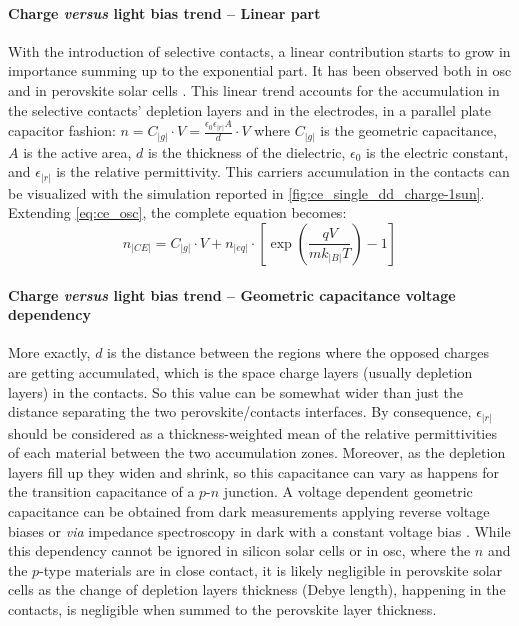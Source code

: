 		\paragraph{Charge \textsl{versus} light bias trend -- Linear part}
		With the introduction of selective contacts, a linear contribution starts to grow in importance summing up to the exponential part.
		It has been observed both in \gls{osc} \cite{Ryan2017a,Credgington2014} and in perovskite solar cells \cite{Gelmetti2017,Wheeler2017,Du2018}.
		This linear trend accounts for the accumulation in the selective contacts' depletion layers and in the electrodes, in a parallel plate capacitor fashion: $n = C_|g| \cdot V = \frac{\epsilon_0 \epsilon_|r| A}{d} \cdot V$ where $C_|g|$ is the geometric capacitance, $A$ is the active area, $d$ is the thickness of the dielectric, $\epsilon_0$ is the electric constant, and $\epsilon_|r|$ is the relative permittivity.
		This carriers accumulation in the contacts can be visualized with the simulation reported in \cref{fig:ce_single_dd_charge-1sun}.
		Extending \cref{eq:ce_osc}, the complete equation becomes:
		\begin{equation}\label{eq:ce_full}
			n_|CE| = C_|g| \cdot V + n_|eq| \cdot \left[\exp(\frac{qV}{mk_|B|T}) - 1\right]
		\end{equation}
		
		\paragraph{Charge \textsl{versus} light bias trend -- Geometric capacitance voltage dependency}
		More exactly, $d$ is the distance between the regions where the opposed charges are getting accumulated, which is the space charge layers (usually depletion layers) in the contacts.
		So this value can be somewhat wider than just the distance separating the two perovskite/contacts interfaces.
		By consequence, $\epsilon_|r|$ should be considered as a thickness-weighted mean of the relative permittivities of each material between the two accumulation zones.
		Moreover, as the depletion layers fill up they widen and shrink, so this capacitance can vary as happens for the transition capacitance of a $p$-$n$ junction.
		A voltage dependent geometric capacitance can be obtained from dark  measurements applying reverse voltage biases \cite{Kiermasch2018} or \textsl{via} impedance spectroscopy in dark with a constant voltage bias \cite{Brus2016,Pockett2015}.
		While this dependency cannot be ignored in silicon solar cells or in \gls{osc}, where the $n$ and the $p$-type materials are in close contact, it is likely negligible in perovskite solar cells as the change of depletion layers thickness (Debye length), happening in the contacts, is negligible when summed to the perovskite layer thickness.

